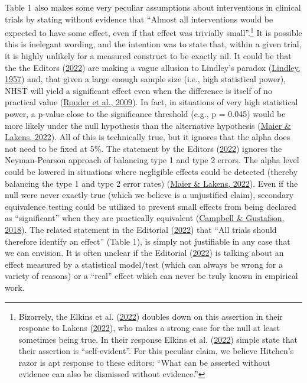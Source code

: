 \documentclass[]{cik}%
\begin{document}
Table 1 also makes some very peculiar assumptions about interventions in
clinical trials by stating without evidence that ``Almost all
interventions would be expected to have some effect, even if that effect
was trivially small''.\footnote{Bizarrely, the Elkins et al.
  (\protect\hyperlink{ref-elkinsres}{2022}) doubles down on this
  assertion in their response to Lakens
  (\protect\hyperlink{ref-lakensres}{2022}), who makes a strong case for
  the null at least sometimes being true. In their response Elkins et
  al. (\protect\hyperlink{ref-elkinsres}{2022}) simple state that their
  assertion is ``self-evident''. For this peculiar claim, we believe
  Hitchen's razor is apt response to these editors: ``What can be
  asserted without evidence can also be dismissed without evidence.''}
It is possible this is inelegant wording, and the intention was to state
that, within a given trial, it is highly unlikely for a measured
construct to be exactly nil. It could be that the the Editors
(\protect\hyperlink{ref-elkins2022}{2022}) are making a vague allusion
to Lindley's paradox (\protect\hyperlink{ref-lindley}{Lindley, 1957})
and, that given a large enough sample size (i.e., high statistical
power), NHST will yield a significant effect even when the difference is
itself of no practical value
(\protect\hyperlink{ref-rouder2009bayesian}{Rouder et al., 2009}). In
fact, in situations of very high statistical power, a p-value close to
the significance threshold (e.g., p = 0.045) would be more likely under
the null hypothesis than the alternative hypothesis
(\protect\hyperlink{ref-maier2022}{Maier \& Lakens, 2022}). All of this
is technically true, but it ignores that the alpha does not need to be
fixed at 5\%. The statement by the Editors
(\protect\hyperlink{ref-elkins2022}{2022}) ignores the Neyman-Pearson
approach of balancing type 1 and type 2 errors. The alpha level could be
lowered in situations where negligible effects could be detected
(thereby balancing the type 1 and type 2 error rates)
(\protect\hyperlink{ref-maier2022}{Maier \& Lakens, 2022}). Even if the
null were never exactly true (which we believe is a unjustified claim),
secondary equivalence testing could be utilized to prevent small effects
from being declared as ``significant'' when they are practically
equivalent (\protect\hyperlink{ref-campbell2018}{Campbell \& Gustafson,
2018}). The related statement in the Editorial
(\protect\hyperlink{ref-elkins2022}{2022}) that ``All trials should
therefore identify an effect'' (Table 1), is simply not justifiable in
any case that we can envision. It is often unclear if the Editorial
(\protect\hyperlink{ref-elkins2022}{2022}) is talking about an effect
measured by a statistical model/test (which can always be wrong for a
variety of reasons) or a ``real'' effect which can never be truly known
in empirical work.
\end{document}
